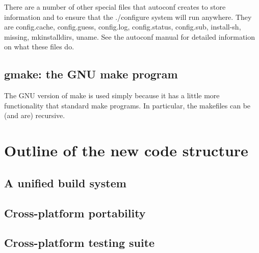 \documentclass[12pt]{article}
\begin{document}
There are a number of other special files that autoconf creates to store
information and to ensure that the ./configure system will run anywhere.  They
are config.cache, config.guess, config.log, config.status, config.sub,
install-sh, missing, mkinstalldirs, uname.  See the autoconf manual for
detailed information on what these files do.



\subsection{gmake: the GNU make program}
The GNU version of make is used simply because it has a little more
functionality that standard make programs.  In particular, the makefiles can
be (and are) recursive.

\section{Outline of the new code structure}

\subsection{A unified build system}

\subsection{Cross-platform portability}

\subsection{Cross-platform testing suite}

\end{document}
